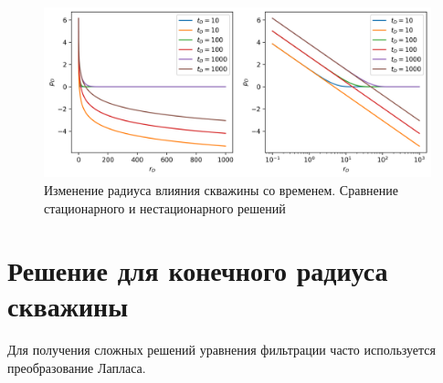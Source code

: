 \begin{figure}[h!]
	\begin{center}
		\includegraphics[width=12cm]{pics/stac_radius_investigation_1.png}
		\caption{Изменение радиуса влияния скважины со временем. Сравнение стационарного и нестационарного решений}
		\label{ris:stac_radius_investigation_1}
	\end{center}
\end{figure}



\section{Решение для конечного радиуса скважины}
Для получения сложных решений уравнения фильтрации часто используется преобразование Лапласа.

